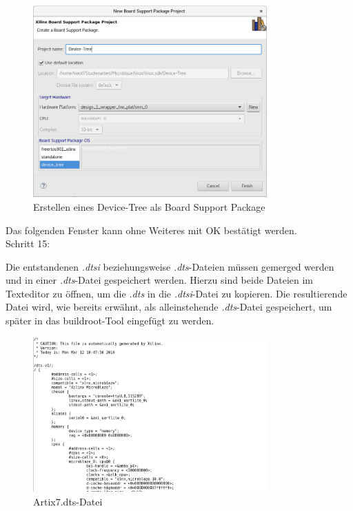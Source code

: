 \begin{figure}[H]
\centering
\includegraphics[width=0.8\textwidth]{Hauptteil/Schritt14.png}
\caption{Erstellen eines Device-Tree als Board Support Package}\label{fig:mbschritt14}
\end{figure}

Das folgenden Fenster kann ohne Weiteres mit OK bestätigt werden.\\


Schritt 15:

Die entstandenen \emph{.dtsi} beziehungsweise \emph{.dts}-Dateien müssen gemerged werden und in einer \emph{.dts}-Datei gespeichert werden.
Hierzu sind beide Dateien im Texteditor zu öffnen, um die \emph{.dts}
 in die \emph{.dtsi}-Datei zu kopieren.
 Die resultierende Datei wird, wie bereits erwähnt, als alleinstehende \emph{.dts}-Datei gespeichert, um später in das buildroot-Tool eingefügt zu werden.

\begin{figure}[H]
\centering
\includegraphics[width=0.8\textwidth]{Hauptteil/Schritt15.png}
\caption{Artix7.dts-Datei}\label{fig:mbschritt15}
\end{figure}


